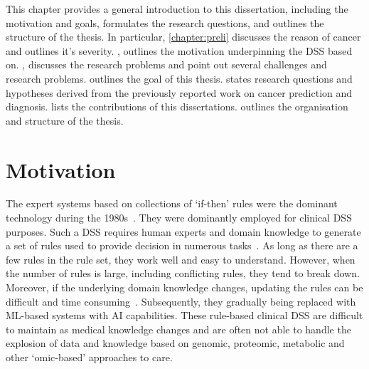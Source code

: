 \hspace*{3.5mm} This chapter provides a general introduction to this dissertation, including the motivation and goals, formulates the research questions, and outlines the structure of the thesis. 
In particular, \cref{chapter:preli} discusses the reason of cancer and outlines it's severity. , outlines the motivation underpinning the DSS based on. , discusses the research problems and point out several challenges and research problems.  outlines the goal of this thesis.  states research questions and hypotheses derived from the previously reported work on cancer prediction and diagnosis.  lists the contributions of this dissertations.  outlines the organisation and structure of the thesis. 


\section{Motivation}\label{motivations}
The expert systems based on collections of `if-then' rules were the dominant technology during the 1980s~\cite{davenport2019potential}. They were dominantly employed for clinical DSS purposes. Such a DSS requires human experts and domain knowledge to generate a set of rules used to provide decision in numerous tasks~\cite{davenport2019potential}. As long as there are a few rules in the rule set, they work well and easy to understand. However, when the number of rules is large, including conflicting rules, they tend to break down. Moreover, if the underlying domain knowledge changes, updating the rules can be difficult and time consuming~\cite{davenport2019potential}. Subsequently, they gradually being replaced with ML-based systems with AI capabilities. These rule-based clinical DSS are difficult to maintain as medical knowledge changes and are often not able to handle the explosion of data and knowledge based on genomic, proteomic, metabolic and other ‘omic-based’ approaches to care. 

